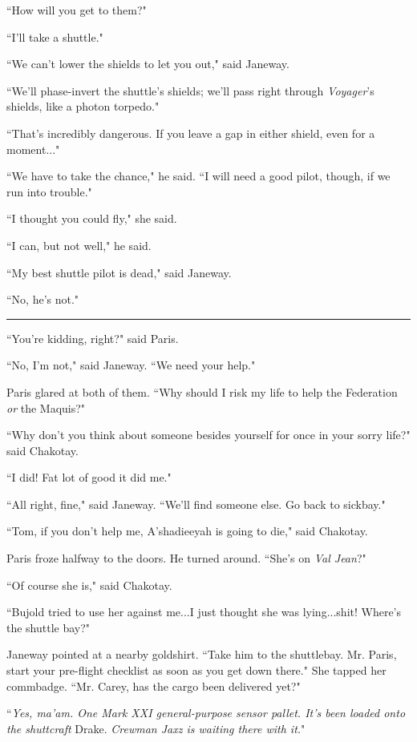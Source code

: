 \documentclass[twoside,letterpaper,12pt]{memoir}
\begin{document}
``How will you get to them?"

``I'll take a shuttle."

``We can't lower the shields to let you out," said Janeway.

``We'll phase-invert the shuttle's shields; we'll pass right through \textit{Voyager}'s shields, like a photon torpedo."

``That's incredibly dangerous. If you leave a gap in either shield, even for a moment..."

``We have to take the chance," he said. ``I will need a good pilot, though, if we run into trouble."

``I thought you could fly," she said.

``I can, but not well," he said.

``My best shuttle pilot is dead," said Janeway.

``No, he's not."

\begin{center}\rule{3cm}{0.4 pt}\end{center}

``You're kidding, right?" said Paris.

``No, I'm not," said Janeway. ``We need your help."

Paris glared at both of them. ``Why should I risk my life to help the Federation \textit{or} the Maquis?"

``Why don't you think about someone besides yourself for once in your sorry life?" said Chakotay.

``I did! Fat lot of good it did me."

``All right, fine," said Janeway. ``We'll find someone else. Go back to sickbay."

``Tom, if you don't help me, A'shadieeyah is going to die," said Chakotay.

Paris froze halfway to the doors. He turned around. ``She's on \textit{Val Jean}?"

``Of course she is," said Chakotay.

``Bujold tried to use her against me...I just thought she was lying...shit! Where's the shuttle bay?"

Janeway pointed at a nearby goldshirt. ``Take him to the shuttlebay. Mr. Paris, start your pre-flight checklist as soon as you get down there." She tapped her commbadge. ``Mr. Carey, has the cargo been delivered yet?"

``\textit{Yes, ma'am. One Mark XXI general-purpose sensor pallet. It's been loaded onto the shuttcraft} Drake. \textit{Crewman Jaxz is waiting there with it.}"
\end{document}
